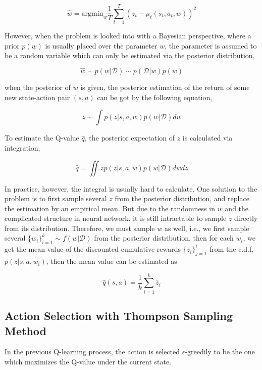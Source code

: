 \documentclass[a4paper,12pt]{article}
\begin{document}
\begin{equation}
\hat{w} = \textrm{argmin}_w \frac{1}{T}\sum_{t=1}^T (z_t - \mu_t(s_t, a_t, w))^2
\end{equation}

However, when the problem is looked into with a Bayesian perspective, where a prior $p(w)$ is usually placed over the parameter $w$, the parameter is assumed to be a random variable which can only be estimated via the posterior distribution, 

\begin{equation}
\hat{w} \sim p(w | \mathcal{D}) \sim p(\mathcal{D} | w)p(w)
\end{equation}

when the posterior of $w$ is given, the posterior estimation of the return of some new state-action pair $(s, a)$ can be got by the following equation,

\begin{displaymath}
z \sim \int p(z | s, a, w)p(w | \mathcal{D}) dw
\end{displaymath}

To estimate the Q-value $\hat{q}$, the posterior expectation of $z$ is calculated via integration,  

\begin{equation}
\hat{q} = \iint zp(z | s, a, w)p(w | \mathcal{D}) dwdz
\end{equation}

 In practice, however, the integral is usually hard to calculate. One solution to the problem is to first sample several $z$ from the posterior distribution, and replace the estimation by an empirical mean. But due to the randomness in $w$ and the complicated structure in neural network, it is still intractable to sample $z$ directly from its distribution. Therefore, we must sample $w$ as well, i.e., we first sample several $\{w_i\}_{i=1}^k \sim f(w | \mathcal{D})$ from the posterior distribution, then for each $w_i$, we get the mean value of the discounted cumulative rewards $\{\bar{z}_i\}_{j=1}^l$ from the c.d.f. $p(z | s, a, w_i)$, then the mean value can be estimated as  

\begin{equation}
\hat{q}(s, a) = \frac{1}{k}\sum_{i=1}^k \bar{z}_i
\end{equation}

\subsection{Action Selection with Thompson Sampling Method}
In the previous Q-learning process, the action is selected $\epsilon$-greedily to be the one which maximizes the Q-value under the current state. 
\end{document}
